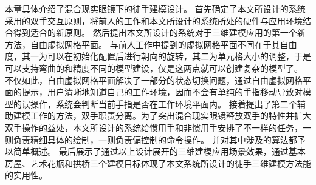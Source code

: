本章具体介绍了混合现实眼镜下的徒手建模设计。
首先确定了本文所设计的系统采用的双手交互原则，将前人的工作和本文所设计的系统所处的硬件与应用环境结合得到适合的新原则。
然后提出本文所设计的系统对于三维建模应用的第一个新方法，自由虚拟网格平面。
与前人工作中提到的虚拟网格平面不同在于其自由度，其一为可以在初始化配置后进行朝向的旋转，其二为单元格大小的调整，于是可以支持弯曲的和精度不同的模型建设，仅是这两点就可以创建复杂的模型了。
不仅如此，自由虚拟网格平面解决了一部分的状态切换问题，通过自由虚拟网格平面的提示，用户清晰地知道自己的工作环境，因而不会有单纯的手指移动导致对模型的误操作，系统会判断当前手指是否在工作环境平面内。
接着提出了第二个辅助建模工作的方法，双手职责分离。为了突出混合现实眼镜释放双手的特性并扩大双手操作的益处，本文所设计的系统给惯用手和非惯用手安排了不一样的任务，一则负责精细具体的绘制，一则负责偏控制的命令操作。
并对其中涉及的算法都予以简单概述。
最后展示了通过以上设计展开的三维建模应用场景效果，通过基本房屋、艺术花瓶和拱桥三个建模目标体现了本文系统所设计的徒手三维建模方法能的实用性。